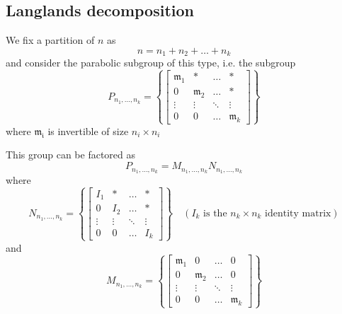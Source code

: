 \documentclass[12pt]{article} %
\begin{document}
\subsection{Langlands decomposition}
We fix a partition of $n$ as
\[n=n_1+n_2+\ldots+n_k\]
and consider the parabolic subgroup of this type, i.e. the subgroup
\[P_{n_1,\ldots, n_k} = \left\lbrace \begin{bmatrix}
        \mathfrak{m}_1 & \ast           & \ldots & \ast           \\
        0              & \mathfrak{m}_2 & \ldots & \ast           \\
        \vdots         & \vdots         & \ddots & \vdots         \\
        0              & 0              & \ldots & \mathfrak{m}_k
    \end{bmatrix} \right\rbrace\]
where $\mathfrak{m_i}$ is invertible of size $n_i \times n_i$

This group can be factored as
\[P_{n_1,\ldots, n_k} =M_{n_1,\ldots, n_k}N_{n_1,\ldots, n_k}\]
where
\[N_{n_1,\ldots, n_k} = \left\lbrace \begin{bmatrix}
        I_1    & \ast   & \ldots & \ast   \\
        0      & I_2    & \ldots & \ast   \\
        \vdots & \vdots & \ddots & \vdots \\
        0      & 0      & \ldots & I_k
    \end{bmatrix} \right\rbrace \quad \left(I_k \text{ is the $n_k\times n_k$ identity matrix}\right)\]
and
\[M_{n_1,\ldots, n_k} = \left\lbrace \begin{bmatrix}
        \mathfrak{m}_1 & 0              & \ldots & 0              \\
        0              & \mathfrak{m}_2 & \ldots & 0              \\
        \vdots         & \vdots         & \ddots & \vdots         \\
        0              & 0              & \ldots & \mathfrak{m}_k
    \end{bmatrix} \right\rbrace\]
\end{document}
